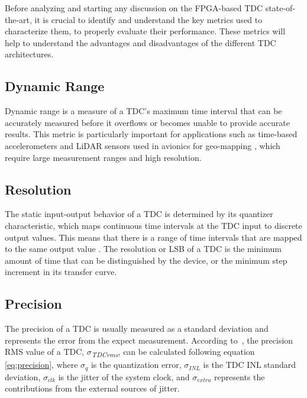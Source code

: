 
Before analyzing and starting any discussion on the \gls{FPGA}-based \gls{TDC} state-of-the-art, it is crucial to identify and understand the key metrics used to characterize them, to properly evaluate their performance. These metrics will help to understand the advantages and disadvantages of the different \gls{TDC} architectures.

\subsection{Dynamic Range} %
\label{sub:dynamic_range}

Dynamic range is a measure of a \gls{TDC}'s maximum time interval that can be accurately measured before it overflows or becomes unable to provide accurate results. This metric is particularly important for applications such as time-based accelerometers \citep{accelerometer} and LiDAR sensors used in avionics for geo-mapping \citep{airborne_lidar}, which require large measurement ranges and high resolution.


\subsection{Resolution} %
\label{sub:resolution}

The static input-output behavior of a \gls{TDC} is determined by its quantizer characteristic, which maps continuous time intervals at the \gls{TDC} input to discrete output values. This means that there is a range of time intervals that are mapped to the same output value \citep[Chap.~3]{henzler_book}. The resolution or \gls{LSB} of a \gls{TDC} is the minimum amount of time that can be distinguished by the device, or the minimum step increment in its transfer curve.


\subsection{Precision} %
\label{sub:precision}

The precision of a \gls{TDC} is usually measured as a standard deviation and represents the error from the expect measurement. According to~\citep{cheng_ov}, the precision \gls{RMS} value of a \gls{TDC}, $\sigma$\textit{\textsubscript{TDCrms}}, can be calculated following equation \ref{eq:precision}, where $\sigma_{q}$ is the quantization error, $\sigma_{INL}$ is the \gls{TDC} \gls{INL} standard deviation, $\sigma_{clk}$ is the jitter of the system clock, and $\sigma_{extra}$ represents the contributions from the external sources of jitter.

